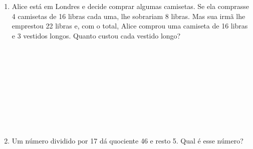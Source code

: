 \documentclass[a4paper,14pt]{article}
\begin{document}
\begin{multicols}{2}
\begin{enumerate}
   			\item Alice está em Londres e decide comprar algumas camisetas. Se ela comprasse 4 camisetas de 16 libras cada uma, lhe sobrariam 8 libras. Mas sua irmã lhe emprestou 22 libras e, com o total, Alice comprou uma camiseta de 16 libras e 3 vestidos longos. Quanto custou cada vestido longo? \\\\\\\\\\\\\\\\\\\\
   			\item Um número dividido por 17 dá quociente 46 e resto 5. Qual é esse número?
        \end{enumerate}
        $~$ \\ $~$ \\ $~$ \\ $~$ \\ $~$ \\ $~$ \\ $~$ \\ $~$ \\ $~$ \\ $~$ \\ $~$ \\ $~$ \\ $~$  \\ $~$ \\ $~$ \\ $~$ \\ $~$ \\ $~$ \\ $~$ \\ $~$ \\ $~$ \\ $~$ \\ $~$ \\ $~$ \\ $~$ \\ $~$ \\ $~$ \\ $~$ \\ $~$ \\ $~$ \\ $~$ \\ $~$ \\ $~$ \\ $~$ \\ $~$ \\ $~$ \\ $~$ \\
	\end{multicols}
\end{document}
